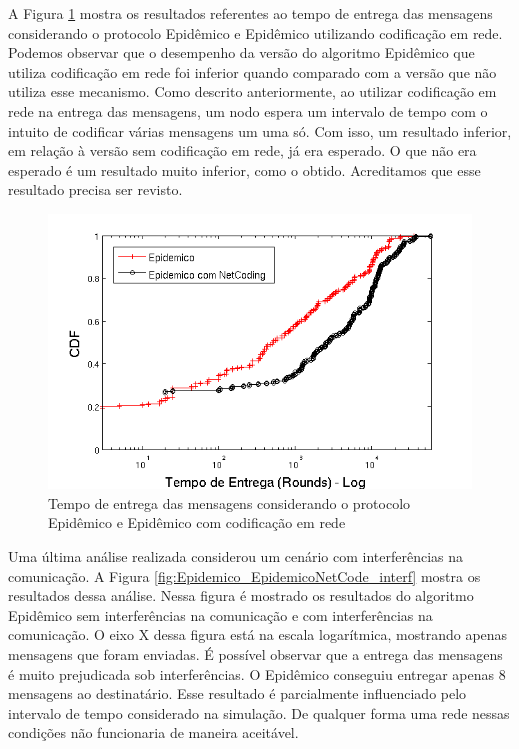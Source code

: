 
A Figura \ref{fig:Epidemico_EpidemicoNetCode} mostra os resultados
referentes ao tempo de entrega das mensagens considerando o protocolo
Epidêmico e Epidêmico utilizando codificação em rede. Podemos observar
que o desempenho da versão do algoritmo Epidêmico que utiliza
codificação em rede foi inferior quando comparado com a versão que não
utiliza esse mecanismo. Como descrito anteriormente, ao utilizar
codificação em rede na entrega das mensagens, um nodo espera um
intervalo de tempo com o intuito de codificar várias mensagens um uma
só. Com isso, um resultado inferior, em relação à versão sem codificação
em rede, já era esperado. O que não era esperado é um resultado muito
inferior, como o obtido. Acreditamos que esse resultado precisa ser
revisto.  

\begin{figure}[ht]
\centering
\includegraphics[width=.7\textwidth]{img/tempo_epidemico_EpidemNetCode.png}
\caption{Tempo de entrega das mensagens considerando o protocolo
Epidêmico e Epidêmico com codificação em rede}
\label{fig:Epidemico_EpidemicoNetCode}
\end{figure}

Uma última análise realizada considerou um cenário com interferências na
comunicação. A Figura \ref{fig:Epidemico_EpidemicoNetCode_interf} mostra
os resultados dessa análise. Nessa figura é mostrado os resultados do
algoritmo Epidêmico sem interferências na comunicação e com
interferências na comunicação.  O eixo X dessa figura está na escala
logarítmica, mostrando apenas mensagens que foram enviadas.  É possível
observar que a entrega das mensagens é muito prejudicada sob
interferências. O Epidêmico conseguiu entregar apenas 8 mensagens ao
destinatário. Esse resultado é parcialmente influenciado pelo intervalo
de tempo considerado na simulação. De qualquer forma uma rede nessas
condições não funcionaria de maneira aceitável.

